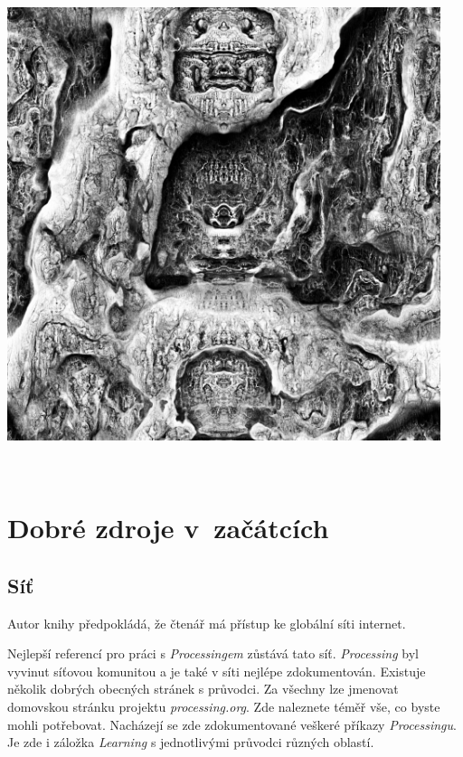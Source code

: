 \documentclass[10pt,twoside=true,open=right,cleardoublepage=empty,chapterprefix=true]{scrbook}
\newcommand{\oddil}[1]{\section{#1}\index{#1}\label{#1}}
\begin{document}
\begin{center}
\includegraphics[width = 0.95\textwidth]{imgs/turingpattern.jpg}
\end{center}

\ 







 







\chapter{Dobré zdroje v~začátcích}

\oddil{Síť}

Autor knihy předpokládá, že čtenář má přístup ke globální síti internet.

Nejlepší referencí pro práci s {\em Processingem} zůstává tato síť. {\em Processing} byl vyvinut síťovou komunitou a je také v síti nejlépe zdokumentován. Existuje několik dobrých obecných stránek s průvodci. Za všechny lze jmenovat domovskou stránku projektu {\em processing.org}. Zde naleznete téměř vše, co byste mohli potřebovat. Nacházejí se zde zdokumentované veškeré příkazy {\em Processingu}. Je zde i záložka {\em Learning} s jednotlivými průvodci různých oblastí.
\end{document}
